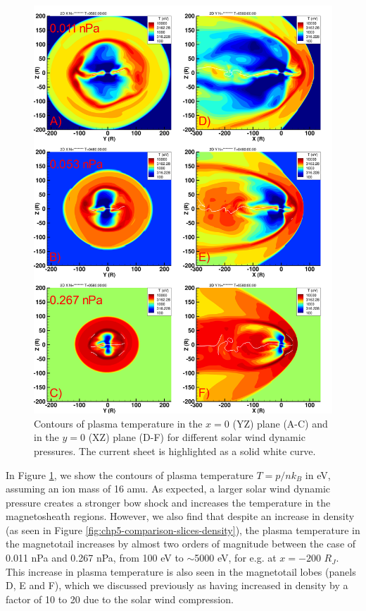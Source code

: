 \begin{figure}
    \centering
    \includegraphics[height=0.9\textheight]{images5/compare_runs_currentsheet_Temperature.png}
    \caption{Contours of plasma temperature in the $x=0$ (YZ) plane (A-C) and in the $y=0$ (XZ) plane (D-F) for different solar wind dynamic pressures. The current sheet is highlighted as a solid white curve.}
    \label{fig:chp5-comparison-slices-temperature}
\end{figure}

In Figure \ref{fig:chp5-comparison-slices-temperature}, we show the contours of plasma temperature $T = p/nk_B$ in eV, assuming an ion mass of 16 amu. As expected, a larger solar wind dynamic pressure creates a stronger bow shock and increases the temperature in the magnetosheath regions. However, we also find that despite an increase in density (as seen in Figure \ref{fig:chp5-comparison-slices-density}), the plasma temperature in the magnetotail increases by almost two orders of magnitude between the case of 0.011 nPa and 0.267 nPa, from 100 eV to $\sim$5000 eV, for e.g. at $x=-200$ $R_J$. This increase in plasma temperature is also seen in the magnetotail lobes (panels D, E and F), which we discussed previously as having increased in density by a factor of 10 to 20 due to the solar wind compression. 


